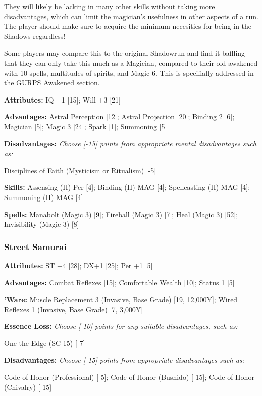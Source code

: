 \begin{multicols*}{2}
	They will likely be lacking in many other skills without taking more disadvantages, which can limit the magician's usefulness in other aspects of a run. The player should make sure to acquire the minimum necesities for being in the Shadows regardless!
	
	Some players may compare this to the original Shadowrun and find it baffling that they can only take this much as a Magician, compared to their old awakened with 10 spells, multitudes of spirits, and Magic 6. This is specifially addressed in the \hyperref[gurps_awakened]{GURPS Awakened section.}
	
	\textbf{Attributes: } IQ +1 [15]; Will +3 [21]
	
	\textbf{Advantages: } Astral Perception [12]; Astral Projection [20]; Binding 2 [6]; Magician [5]; Magic 3 [24]; Spark [1]; Summoning [5]
	
	\textbf{Disadvantages: } \textit{Choose [-15] points from appropriate mental disadvantages such as:}
	
	Disciplines of Faith (Mysticism or Ritualism) [-5]
	
	\textbf{Skills: } Assensing (H) Per [4]; Binding (H) MAG [4]; Spellcasting (H) MAG [4]; Summoning (H) MAG [4]
	
	\textbf{Spells: } Manabolt (Magic 3) [9]; Fireball (Magic 3) [7]; Heal (Magic 3) [52]; Invisibility (Magic 3) [8]
	
	
	\subsubsection{Street Samurai}
	\begin{flushright}
		
	\end{flushright}
	
	\textbf{Attributes:} ST +4 [28]; DX+1 [25]; Per +1 [5]
	
	\textbf{Advantages:} Combat Reflexes [15]; Comfortable Wealth [10]; Status 1 [5]
	
	\textbf{'Ware:}	Muscle Replacement 3 (Invasive, Base Grade) [19, 12,000¥]; Wired Reflexes 1 (Invasive, Base Grade) [7, 3,000¥]
	
	\textbf{Essence Loss:} \textit{Choose [-10] points for any suitable disadvantages, such as:}
	
	One the Edge (SC 15) [-7]
	
	\textbf{Disadvantages:}	\textit{Choose [-15] points from appropriate disadvantages such as:}
	
	Code of Honor (Professional) [-5]; Code of Honor (Bushido) [-15]; Code of Honor (Chivalry) [-15]
	

\end{multicols*}
